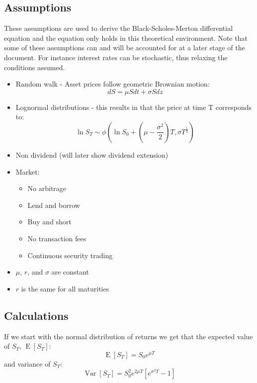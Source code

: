 \documentclass{article}
\DeclareMathOperator{\Var}{Var}
\DeclareMathOperator{\E}{E}
\begin{document}
\subsection{Assumptions}
These assumptions are used to derive the Black-Scholes-Merton differential equation and the equation only holds in this theoretical environment. Note that some of these assumptions can and will be accounted for at a later stage of the document. For instance interest rates can be stochastic, thus relaxing the conditions assumed.
\begin{itemize}
    \item Random walk - Asset prices follow geometric Brownian motion: 
    \begin{equation*}
        dS = \mu S dt + \sigma S dz
    \end{equation*}
    \item Lognormal distributions - this results in that the price at time T corresponds to: 
    \begin{equation} \label{eq:19}
        \ln S_{T} \sim \phi\left(\ln S_{0} + \left(\mu - \frac{\sigma^{2}}{2}\right)T, \sigma T^{\frac{1}{2}}\right)
    \end{equation}
    \item Non dividend (will later show dividend extension)
    \item Market:
    \begin{itemize}
        \item No arbitrage
        \item Lend and borrow
        \item Buy and short
        \item No transaction fees
        \item Continuous security trading
    \end{itemize}
    \item $\mu$, $r$, and $\sigma$ are constant
    \item $r$ is the same for all maturities
\end{itemize}
\subsection{Calculations}
If we start with the normal distribution of returns we get that the expected value of $S_{T}$, $\E[S_{T}]$: 
\begin{equation*}
    \E[S_{T}] = S_{0} e^{\mu T}
\end{equation*}
and variance of $S_{T}$:
\begin{equation*}
    \Var[S_{T}] = S_{0}^{2} e^{2\mu T}[e^{\sigma^{2}T}-1]
\end{equation*}
\end{document}
